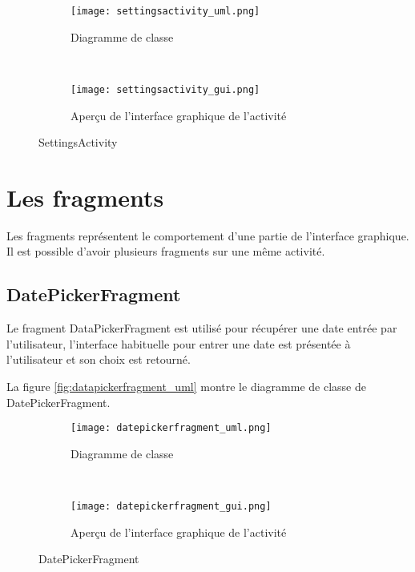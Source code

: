 \begin{figure}[htb!]
    \centering
    \begin{subfigure}[htb]{0.49\textwidth}
		\texttt{[image: settingsactivity\_uml.png]} 
		\caption{Diagramme de classe}
		\label{fig:settingsactivity_uml}
    \end{subfigure}
    ~ %
    \begin{subfigure}[htb]{0.49\textwidth}
		\texttt{[image: settingsactivity\_gui.png]} 
		\caption{Aperçu de l'interface graphique de l'activité}
		\label{fig:settingsactivity_gui}
    \end{subfigure}
    \caption{SettingsActivity}\label{fig:settingsactivity_fig}
\end{figure}

\section{Les fragments}

Les fragments représentent le comportement d'une partie de l'interface graphique. Il est possible d'avoir plusieurs fragments sur une même activité.

\subsection{DatePickerFragment}

Le fragment DataPickerFragment est utilisé pour récupérer une date entrée par l'utilisateur, l'interface habituelle pour entrer une date est présentée à l'utilisateur et son choix est retourné.

La figure \ref{fig:datapickerfragment_uml} montre le diagramme de classe de DatePickerFragment.

\begin{figure}[htb!]
    \centering
    \begin{subfigure}[htb]{0.49\textwidth}
		\texttt{[image: datepickerfragment\_uml.png]} 
		\caption{Diagramme de classe}
		\label{fig:datepickerfragment_uml}
    \end{subfigure}
    ~ %
    \begin{subfigure}[htb]{0.49\textwidth}
		\texttt{[image: datepickerfragment\_gui.png]} 
		\caption{Aperçu de l'interface graphique de l'activité}
		\label{fig:datepickerfragment_gui}
    \end{subfigure}
    \caption{DatePickerFragment}\label{fig:datepickerfragment_fig}
\end{figure}

